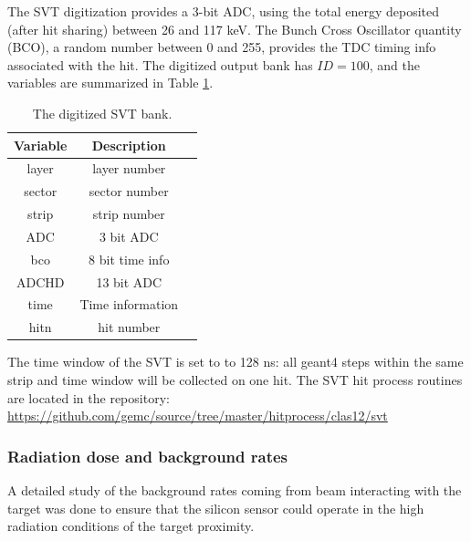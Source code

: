 The SVT digitization provides a 3-bit ADC, using the total energy deposited (after hit sharing) between 26 and 117 keV.
The Bunch Cross Oscillator quantity (BCO), a random number between 0 and 255,
provides the TDC timing info associated with the hit.
The digitized output bank has $ID=100$, and the variables are summarized in Table \ref{tab:bstBank}.

\begin{table}[h]
	\begin{center}
		\begin{tabular}{| c | c | c |}
			\hline \hline
			Variable         & Description   \\
			\hline
               layer  &                                      layer number    \\
              sector  &                                     sector number    \\
               strip  &                                      strip number    \\
                 ADC  &                                         3 bit ADC    \\
                 bco  &                                   8 bit time info    \\
               ADCHD  &                                        13 bit ADC    \\
                time  &                                  Time information    \\
                hitn  &                                        hit number    \\
			\hline \hline
		\end{tabular}
	\end{center}
	\caption{The digitized SVT bank.}\label{tab:bstBank}
\end{table}

\noindent The time window  of the SVT is set to to 128 ns: all geant4 steps within the same strip and time window will be collected on one hit.
The SVT hit process routines are located in the repository: \url{https://github.com/gemc/source/tree/master/hitprocess/clas12/svt}

\subsubsection{Radiation dose and background rates}
A detailed study of the background rates coming from beam interacting with the target was done to ensure that the silicon sensor
could operate in the high radiation conditions of the target proximity.

